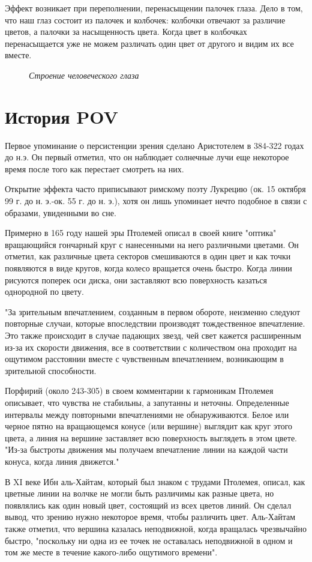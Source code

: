 \documentclass[a4paper, 12pt]{article}
\newcommand{\image}[3]{
	\begin{figure}[ht]
		\center{\texttt{[image: img/\#1]} }
		\caption{\textit{#3}}\end{figure}
}
\begin{document}
Эффект возникает при переполнении, перенасыщении палочек глаза.
Дело в том, что наш глаз состоит из палочек и колбочек: колбочки отвечают
за различие цветов, а палочки за насыщенность цвета. Когда цвет в
колбочках перенасыщается уже не можем различать один цвет от другого и
видим их все вместе.

\image{глаз.png}{170}{Строение человеческого глаза}

\newpage

\section{История POV}

Первое упоминание о персистенции зрения сделано Аристотелем
в 384-322 годах до н.э. Он первый отметил, что он наблюдает
солнечные лучи еще некоторое время после того как перестает
смотреть на них.

Открытие эффекта часто приписывают римскому поэту Лукрецию
(ок. 15 октября 99 г. до н. э.-ок. 55 г. до н. э.), хотя он лишь упоминает
нечто подобное в связи с образами, увиденными во сне.

Примерно в 165 году нашей эры Птолемей описал в своей книге
"оптика" вращающийся гончарный круг с нанесенными на него
различными цветами. Он отметил, как различные цвета секторов
смешиваются в один цвет и как точки появляются в виде кругов, когда
колесо вращается очень быстро. Когда линии рисуются поперек оси
диска, они заставляют всю поверхность казаться однородной по цвету.

"За зрительным впечатлением, созданным в первом обороте, неизменно
следуют повторные случаи, которые впоследствии производят
тождественное впечатление. Это также происходит в случае падающих
звезд, чей свет кажется расширенным из-за их скорости движения, все
в соответствии с количеством она проходит на ощутимом расстоянии
вместе с чувственным впечатлением, возникающим в зрительной
способности.

Порфирий (около 243-305) в своем комментарии к гармоникам
Птолемея описывает, что чувства не стабильны, а запутанны и неточны.
Определенные интервалы между повторными впечатлениями не
обнаруживаются. Белое или черное пятно на вращающемся конусе (или
вершине) выглядит как круг этого цвета, а линия на вершине
заставляет всю поверхность выглядеть в этом цвете. "Из-за быстроты
движения мы получаем впечатление линии на каждой части конуса,
когда линия движется."

В XI веке Ибн аль-Хайтам, который был знаком с трудами
Птолемея, описал, как цветные линии на волчке не могли быть
различимы как разные цвета, но появлялись как один новый цвет,
состоящий из всех цветов линий. Он сделал вывод, что зрению нужно
некоторое время, чтобы различить цвет. Аль-Хайтам также отметил,
что вершина казалась неподвижной, когда вращалась чрезвычайно
быстро, "поскольку ни одна из ее точек не оставалась неподвижной в
одном и том же месте в течение какого-либо ощутимого времени".
\end{document}
